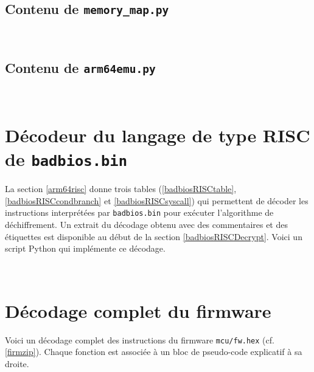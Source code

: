 \documentclass[a4paper,10pt]{article}
\newcommand{\pyinput}[1]{%
    \noindent{\color[rgb]{0.5, 0.5, 0.5}{\rule{\textwidth}{0.4pt}}}
     \\
    \noindent{\color[rgb]{0.5, 0.5, 0.5}{\rule{\textwidth}{0.4pt}}}
}
\begin{document}
\begin{appendices}
\subsection{Contenu de \texttt{memory\_map.py}}

\pyinput{2_arm64/memory_map.py.inc.tex}

\subsection{Contenu de \texttt{arm64emu.py}}

\pyinput{2_arm64/arm64emu.py.inc.tex}

\section{Décodeur du langage de type RISC de \texttt{badbios.bin}}

La section \ref{arm64risc} donne trois tables (\ref{badbiosRISCtable}, \ref{badbiosRISCcondbranch} et \ref{badbiosRISCsyscall}) qui permettent de décoder les instructions interprétées par \texttt{badbios.bin} pour exécuter l'algorithme de déchiffrement. Un extrait du décodage obtenu avec des commentaires et des étiquettes est disponible au début de la section \ref{badbiosRISCDecrypt}. Voici un script Python qui implémente ce décodage.

\pyinput{2_arm64/disasm_badbiosrisc.py.inc.tex}

\section{Décodage complet du firmware}

Voici un décodage complet des instructions du firmware \texttt{mcu/fw.hex} (cf. \ref{firmzip}). Chaque fonction est associée à un bloc de pseudo-code explicatif à sa droite.



\end{appendices}
\end{document}
